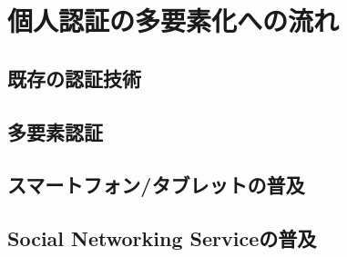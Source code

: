 \chapter{個人認証の多要素化への流れ}\label{chap:preparation}

\section{既存の認証技術}
\section{多要素認証}
\section{スマートフォン/タブレットの普及}
\section{Social Networking Serviceの普及}

\newpage
